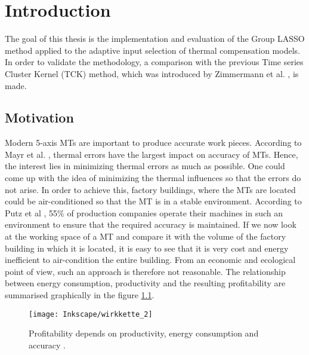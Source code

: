 \setcounter{chapter}{0}

\chapter{Introduction}
\label{sec:introduction}

The goal of this thesis is the implementation and evaluation of the Group LASSO method applied to the adaptive input selection of thermal compensation models. In order to validate the methodology, a comparison with the previous Time series Cluster Kernel (TCK) method, which was introduced by Zimmermann et al. \cite{Zimmermann_2020}, is made.


\section{Motivation}
\label{sec:motivation}

Modern 5-axis MTs are important to produce accurate work pieces.  According to Mayr et al. \cite{Mayr_2012}, thermal errors have the largest impact on accuracy of  MTs. Hence, the interest lies in minimizing thermal errors as much as possible. One could come up with the idea of minimizing the thermal influences so that the errors do not arise. In order to achieve this, factory buildings, where the MTs are located could be air-conditioned so that the MT is in a stable environment. According to Putz et al \cite{Putz2018}, 55\% of production companies operate their machines in such an environment to ensure that the required accuracy is maintained. If we now look at the working space of a MT and compare it with the volume of the factory building in which it is located, it is easy to see that it is very cost and energy inefficient to air-condition the entire building. From an economic and ecological point of view, such an approach is therefore not reasonable. The relationship between energy consumption, productivity and the resulting profitability are summarised graphically in the figure \ref{fig:prf_accuracy}. 

\begin{figure}[!htb]
    \centering
    \texttt{[image: Inkscape/wirkkette\_2]} %
    \caption[Economic and technical relationships]{Profitability depends on productivity, energy consumption and accuracy \cite{Weber2015}.}
    \label{fig:prf_accuracy}
\end{figure}
 

